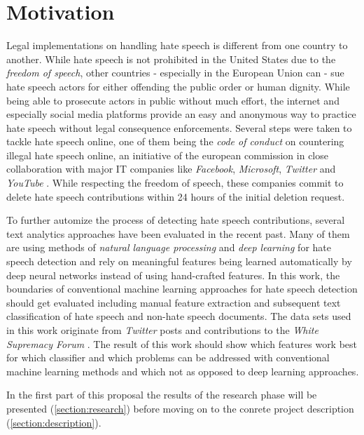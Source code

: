 \section{Motivation}

Legal implementations on handling hate speech is different from one country to another. While hate speech is not prohibited in the United States due to the \textit{freedom of speech}, other countries - especially in the European Union can - sue hate speech actors for either offending the public order or human dignity. While being able to prosecute actors in public without much effort, the internet and especially social media platforms provide an easy and anonymous way to practice hate speech without legal consequence enforcements. Several steps were taken to tackle hate speech online, one of them being the \textit{code of conduct} on countering illegal hate speech online, an initiative of the european commission in close collaboration with major IT companies like \textit{Facebook}, \textit{Microsoft}, \textit{Twitter} and \textit{YouTube} \cite{EuropeanCommission.20200622}. While respecting the freedom of speech, these companies commit to delete hate speech contributions within 24 hours of the initial deletion request. 

To further automize the process of detecting hate speech contributions, several text analytics approaches have been evaluated in the recent past. Many of them are using methods of \textit{natural language processing} and \textit{deep learning} for hate speech detection and rely on meaningful features being learned automatically by deep neural networks instead of using hand-crafted features. In this work, the boundaries of conventional machine learning approaches for hate speech detection should get evaluated including manual feature extraction and subsequent text classification of hate speech and non-hate speech documents. The data sets used in this work originate from \textit{Twitter} posts \cite{ThomasDavidson.2020} and contributions to the \textit{White Supremacy Forum} \cite{OnadeGibert.2020}. The result of this work should show which features work best for which classifier and which problems can be addressed with conventional machine learning methods and which not as opposed to deep learning approaches.

In the first part of this proposal the results of the research phase will be presented (\autoref{section:research}) before moving on to the conrete project description (\autoref{section:description}). 

